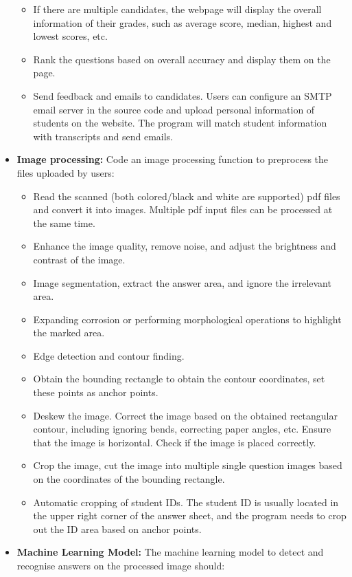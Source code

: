 \documentclass[twocolumn]{article}
\begin{document}
\begin{itemize}
\begin{itemize}
        \item If there are multiple candidates, the webpage will display the overall information of their grades, such as average score, median, highest and lowest scores, etc.
        \item Rank the questions based on overall accuracy and display them on the page.
        \item Send feedback and emails to candidates. Users can configure an SMTP email server in the source code and upload personal information of students on the website. The program will match student information with transcripts and send emails.
    \end{itemize}
    \item \textbf{Image processing:} Code an image processing function to preprocess the files uploaded by users:
    \begin{itemize}
        \item Read the scanned (both colored/black and white are supported) pdf files and convert it into images. Multiple pdf input files can be processed at the same time.
        \item Enhance the image quality, remove noise, and adjust the brightness and contrast of the image.
        \item Image segmentation, extract the answer area, and ignore the irrelevant area.
        \item Expanding corrosion or performing morphological operations to highlight the marked area.
        \item Edge detection and contour finding.
        \item Obtain the bounding rectangle to obtain the contour coordinates, set these points as anchor points.
        \item Deskew the image. Correct the image based on the obtained rectangular contour, including ignoring bends, correcting paper angles, etc. Ensure that the image is horizontal. Check if the image is placed correctly.
        \item Crop the image, cut the image into multiple single question images based on the coordinates of the bounding rectangle.
        \item Automatic cropping of student IDs. The student ID is usually located in the upper right corner of the answer sheet, and the program needs to crop out the ID area based on anchor points.
    \end{itemize}
    \item \textbf{Machine Learning Model:} The machine learning model to detect and recognise answers on the processed image should:

\end{itemize}
\end{document}
